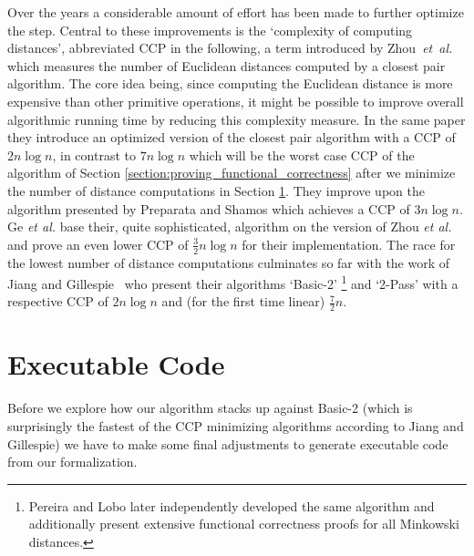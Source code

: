 \begin{isabellebody}
\begin{isamarkuptext}
Over the years a considerable amount of effort has been made to further optimize the  step.
Central to these improvements is the `complexity of computing distances', abbreviated CCP in the following,
a term introduced by \mbox{Zhou \emph{et al.}~\cite{zhou1998improved}} which measures the number of Euclidean
distances computed by a closest pair algorithm. The core idea being, since computing the Euclidean
distance is more expensive than other primitive operations, it might be possible to improve overall
algorithmic running time by reducing this complexity measure. In the same paper they introduce an
optimized version of the closest pair algorithm with a CCP of $2n \log n$, in contrast to $7n \log n$
which will be the worst case CCP of the algorithm of Section \ref{section:proving_functional_correctness}
after we minimize the number of distance computations in Section \ref{section:executable_code}. They
improve upon the algorithm presented by Preparata and Shamos \cite{Computational-Geometry-An-Introduction:1985}
which achieves a CCP of $3n \log n$. Ge \emph{et al.} \cite{Ge2006} base their, quite sophisticated,
algorithm on the version of Zhou \emph{et al.} and prove an even lower CCP of $\frac{3}{2}n \log n$
for their implementation. The race for the lowest number of distance computations culminates so far
with the work of Jiang and Gillespie~\cite{jiang2007engineering} who present their algorithms `Basic-2'
\footnote{Pereira and Lobo \cite{pereira2012optimized} later independently developed the same algorithm
and additionally present extensive functional correctness proofs for all Minkowski distances.} and
`2-Pass' with a respective CCP of $2n \log n$ and (for the first time linear) $\frac{7}{2}n$.

\section{Executable Code} \label{section:executable_code}

Before we explore how our algorithm stacks up against Basic-2 (which is surprisingly the fastest of
the CCP minimizing algorithms according to Jiang and Gillespie) we have to make some final adjustments
to generate executable code from our formalization.


\end{isamarkuptext}
\end{isabellebody}

